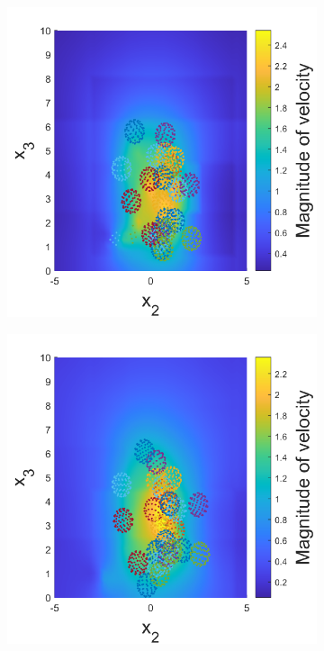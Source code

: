 \begin{figure}
\begin{subfigure}[b]{0.22\textwidth}
    \includegraphics[width=\textwidth]{Images/squirmers/Gyro-2.pdf}
    \caption[]{\label{fig:squirmerB}}
\end{subfigure}
\begin{subfigure}[b]{0.22\textwidth}
    \centering
    \includegraphics[width=\textwidth]{Images/squirmers/Gyro-3.pdf}

\end{subfigure}
\end{figure}
